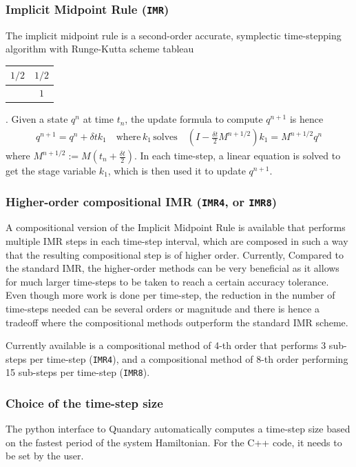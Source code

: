 \documentclass[11pt]{article}
\begin{document}
    \subsubsection{Implicit Midpoint Rule (\texttt{IMR})}
    The implicit midpoint rule is a second-order accurate, symplectic time-stepping algorithm with Runge-Kutta scheme tableau 
    \begin{tabular}{ c | c }
      $1/2$ & $ 1/2$ \\
      \hline
                &  $1$
    \end{tabular}.
    Given a state $q^n$ at time $t_n$, the update formula to compute $q^{n+1}$
    is hence 
    \begin{align}
      q^{n+1} = q^n + \delta t k_1 \quad \text{where} \, k_1 \, \text{solves}
      \quad \left( I-\frac{\delta t}{2} M^{n+1/2} \right) k_1 = M^{n+1/2}  q^n
    \end{align}
    where $M^{n+1/2} := M(t_n + \frac{\delta t}{2})$. In each time-step,
    a linear equation is solved to get the stage variable $k_1$, which is then used it
    to update $q^{n+1}$. 

    \subsubsection{Higher-order compositional IMR (\texttt{IMR4}, or \texttt{IMR8})}
    A compositional version of the Implicit Midpoint Rule is available that performs multiple IMR steps in each time-step interval, which are composed in such a way that the resulting compositional step is of higher order. Currently, Compared to the standard IMR, the higher-order methods can be very beneficial as it allows for much larger time-steps to be taken to reach a certain accuracy tolerance. Even though more work is done per time-step, the reduction in the number of time-steps needed can be several orders or magnitude and there is hence a tradeoff where the compositional methods outperform the standard IMR scheme.

    Currently available is a compositional method of 4-th order that performs 3 sub-steps per time-step (\texttt{IMR4}), and a compositional method of 8-th order performing 15 sub-steps per time-step (\texttt{IMR8}).

    \subsubsection{Choice of the time-step size}
  The python interface to Quandary automatically computes a time-step size based on the fastest period of the system Hamiltonian. For the C++ code, it needs to be set by the user.
\end{document}
